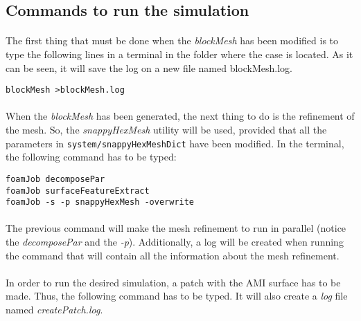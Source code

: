 \subsection{Commands to run the simulation}

\paragraph{}The first thing that must be done when the \textit{blockMesh} has been modified is to type the following lines in a terminal in the folder where the case is located. As it can be seen, it will save the log on a new file named blockMesh.log.

\begin{center}
\texttt{blockMesh >blockMesh.log}
\end{center}

\paragraph{}When the \textit{blockMesh} has been generated, the next thing to do is the refinement of the mesh. So, the \textit{snappyHexMesh} utility will be used, provided that all the parameters in \texttt{system/snappyHexMeshDict} have been modified. In the terminal, the following command has to be typed:

\begin{center}
\texttt{foamJob decomposePar \\
foamJob surfaceFeatureExtract \\
foamJob -s -p snappyHexMesh -overwrite}
\end{center}

\paragraph{}The previous command will make the mesh refinement to run in parallel (notice the \textit{decomposePar} and the \textit{-p}). Additionally, a log will be created when running the command that will contain all the information about the mesh refinement.

\paragraph{}In order to run the desired simulation, a patch with the AMI surface has to be made. Thus, the following command has to be typed. It will also create a \textit{log} file named \textit{createPatch.log}.

